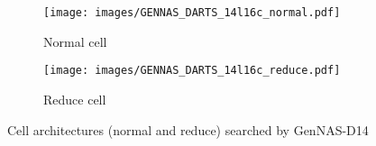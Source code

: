 \documentclass{article}
\begin{document}
\begin{figure}[h]
\centering
     \begin{subfigure}[b]{0.48\textwidth}
         \centering
         \texttt{[image: images/GENNAS\_DARTS\_14l16c\_normal.pdf]}
         \caption{Normal cell}
         \label{fig:D14NORMAL}
     \end{subfigure}
     \hfill
     \begin{subfigure}[b]{0.48\textwidth}
         \centering
         \texttt{[image: images/GENNAS\_DARTS\_14l16c\_reduce.pdf]}
         \caption{Reduce cell}
         \label{fig:D14REDUCE}
     \end{subfigure}
     \hfill
        \caption{Cell architectures (normal and reduce) searched by GenNAS-D14}
        \label{fig:searched_gennas_D14}
\end{figure}
\end{document}
